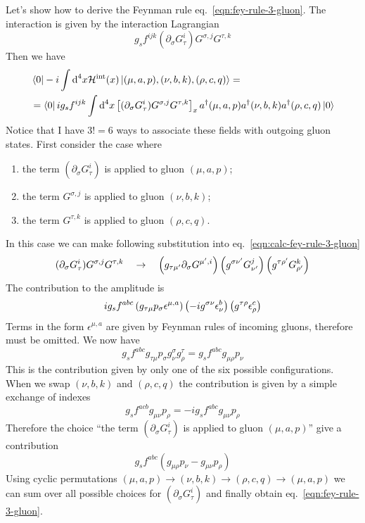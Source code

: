 \documentclass[TheoreticalPhy_ModB.tex]{subfiles}
\begin{document}
\begin{exercise}
Let's show how to derive the Feynman rule eq.~\eqref{eqn:fey-rule-3-gluon}. The interaction is given by the interaction Lagrangian
\[g_sf^{ijk}(\partial_\sigma G_{\tau}^i) G^{\sigma,j} G^{\tau,k}\]
Then we have
\begin{equation}\label{eqn:calc-fey-rule-3-gluon}\begin{split}
&\bra0-i\int\textup{d}^4x\mathcal H^{\text{int}}(x)\ket{(\mu,a,p),(\nu,b,k),(\rho,c,q)}=\\
&=\bra0ig_sf^{ijk}\int\textup{d}^4x\left[(\partial_\sigma G_{\tau}^i) G^{\sigma,j} G^{\tau,k}\right]_x a^\dagger(\mu,a,p)a^\dagger(\nu,b,k)a^\dagger(\rho,c,q)\ket0
\end{split}\end{equation}
Notice that I have $3!=6$ ways to associate these fields with outgoing gluon states. First consider the case where
\begin{enumerate}
\item the term $(\partial_\sigma G_\tau^i)$ is applied to gluon $(\mu,a,p)$;
\item the term $G^{\sigma,j}$ is applied to gluon $(\nu,b,k)$;
\item the term $G^{\tau, k}$ is applied to gluon $(\rho,c,q)$.
\end{enumerate}
In this case we can make following substitution into eq.~\eqref{eqn:calc-fey-rule-3-gluon}
\[(\partial_\sigma G_{\tau}^i) G^{\sigma,j} G^{\tau,k}
\quad\to\quad
\left(g_{\tau\mu'}\partial_\sigma  G^{\mu',i} \right)\left(g^{\sigma\nu'}G^{j}_{\nu'}\right)\left( g^{\tau\rho'}G^{k}_{\rho'}\right)\]
The contribution to the amplitude is 
\[ig_sf^{abc}\p{g_{\tau\mu}p_\sigma  \epsilon^{\mu,a} }\p{-ig^{\sigma\nu}\epsilon^{b}_{\nu}}\p{ g^{\tau\rho}\epsilon^{c}_{\rho}}
\]
Terms in the form $ \epsilon^{\mu,a}$ are given by Feynman rules of incoming gluons, therefore must be omitted. We now have
\[g_sf^{abc}g_{\tau\mu}p_\sigma g^{\sigma}_\nu g^{\tau}_\rho
=g_sf^{abc}g_{\mu\rho}p_\nu
\]
This is the contribution given by only one of the six possible configurations. When we swap $(\nu,b,k)$ and $(\rho,c,q)$ the contribution is given by a simple exchange of indexes
\[g_sf^{acb}g_{\mu\nu}p_\rho=-ig_sf^{abc}g_{\mu\nu}p_\rho\]
Therefore the choice ``the term $(\partial_\sigma G_\tau^i)$ is applied to gluon $(\mu,a,p)$'' give a contribution
\[g_sf^{abc}(g_{\mu\rho}p_\nu-g_{\mu\nu}p_\rho)\]
Using cyclic permutations  $(\mu,a,p)\to(\nu,b,k)\to(\rho,c,q)\to(\mu,a,p)$ we can sum over all possible choices for $(\partial_\sigma G_\tau^i)$ and finally obtain eq.~\eqref{eqn:fey-rule-3-gluon}.
\end{exercise}
\end{document}
